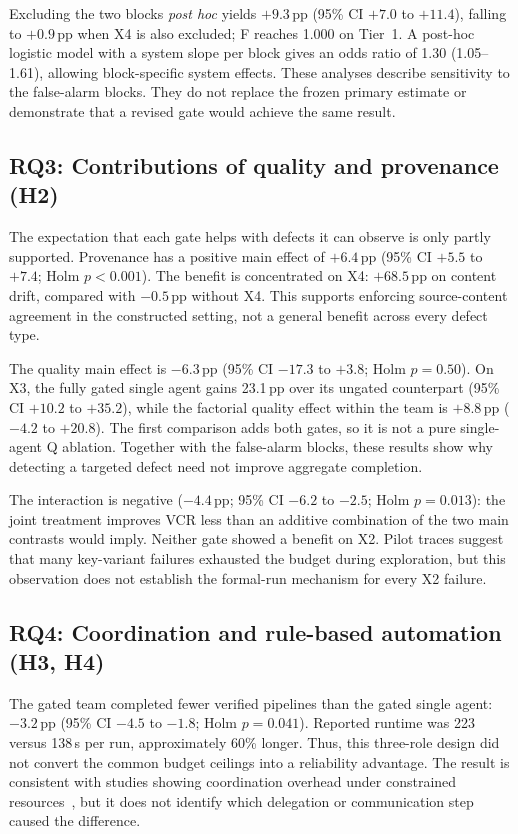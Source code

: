 \documentclass[conference]{IEEEtran}
\newcommand{\sys}[1]{\textsf{#1}}
\begin{document}
Excluding the two blocks \emph{post hoc} yields $+9.3$\,pp (95\% CI $+7.0$ to $+11.4$), falling to $+0.9$\,pp when X4 is also excluded; \sys{F} reaches 1.000 on Tier~1. A post-hoc logistic model with a system slope per block gives an odds ratio of 1.30 (1.05--1.61), allowing block-specific system effects. These analyses describe sensitivity to the false-alarm blocks. They do not replace the frozen primary estimate or demonstrate that a revised gate would achieve the same result.

\subsection{RQ3: Contributions of quality and provenance (H2)}
The expectation that each gate helps with defects it can observe is only partly supported. Provenance has a positive main effect of $+6.4$\,pp (95\% CI $+5.5$ to $+7.4$; Holm $p<0.001$). The benefit is concentrated on X4: $+68.5$\,pp on content drift, compared with $-0.5$\,pp without X4. This supports enforcing source-content agreement in the constructed setting, not a general benefit across every defect type.

The quality main effect is $-6.3$\,pp (95\% CI $-17.3$ to $+3.8$; Holm $p=0.50$). On X3, the fully gated single agent gains 23.1\,pp over its ungated counterpart (95\% CI $+10.2$ to $+35.2$), while the factorial quality effect within the team is $+8.8$\,pp ($-4.2$ to $+20.8$). The first comparison adds both gates, so it is not a pure single-agent Q ablation. Together with the false-alarm blocks, these results show why detecting a targeted defect need not improve aggregate completion.

The interaction is negative ($-4.4$\,pp; 95\% CI $-6.2$ to $-2.5$; Holm $p=0.013$): the joint treatment improves VCR less than an additive combination of the two main contrasts would imply. Neither gate showed a benefit on X2. Pilot traces suggest that many key-variant failures exhausted the budget during exploration, but this observation does not establish the formal-run mechanism for every X2 failure.

\subsection{RQ4: Coordination and rule-based automation (H3, H4)}
The gated team completed fewer verified pipelines than the gated single agent: $-3.2$\,pp (95\% CI $-4.5$ to $-1.8$; Holm $p=0.041$). Reported runtime was 223 versus 138\,s per run, approximately 60\% longer. Thus, this three-role design did not convert the common budget ceilings into a reliability advantage. The result is consistent with studies showing coordination overhead under constrained resources~\cite{tran2026single,dylan2026equalcost}, but it does not identify which delegation or communication step caused the difference.
\end{document}
